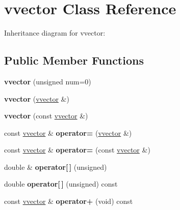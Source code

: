 \hypertarget{classvvector}{}\section{vvector Class Reference}
\label{classvvector}


Inheritance diagram for vvector\+:
\subsection*{Public Member Functions}
\begin{DoxyCompactItemize}
\item 
{\bfseries vvector} (unsigned num=0)\hypertarget{classvvector_a430ddabbbcd9e7f502710753573e07fa}{}\label{classvvector_a430ddabbbcd9e7f502710753573e07fa}

\item 
{\bfseries vvector} (\hyperlink{classvvector}{vvector} \&)\hypertarget{classvvector_a45fce2b52145ad89438753ada8e326b0}{}\label{classvvector_a45fce2b52145ad89438753ada8e326b0}

\item 
{\bfseries vvector} (const \hyperlink{classvvector}{vvector} \&)\hypertarget{classvvector_aa6f4bd016b72ea5128353bd5d08b8daa}{}\label{classvvector_aa6f4bd016b72ea5128353bd5d08b8daa}

\item 
const \hyperlink{classvvector}{vvector} \& {\bfseries operator=} (\hyperlink{classvvector}{vvector} \&)\hypertarget{classvvector_ac4f13dc26ec1e99676cf8be97a005ef6}{}\label{classvvector_ac4f13dc26ec1e99676cf8be97a005ef6}

\item 
const \hyperlink{classvvector}{vvector} \& {\bfseries operator=} (const \hyperlink{classvvector}{vvector} \&)\hypertarget{classvvector_ad595f03686c76b17701a02ef5059e5d8}{}\label{classvvector_ad595f03686c76b17701a02ef5059e5d8}

\item 
double \& {\bfseries operator\mbox{[}$\,$\mbox{]}} (unsigned)\hypertarget{classvvector_aabd73bf2650cea3493f8b659b07ea6da}{}\label{classvvector_aabd73bf2650cea3493f8b659b07ea6da}

\item 
double {\bfseries operator\mbox{[}$\,$\mbox{]}} (unsigned) const \hypertarget{classvvector_a0d67b734c51f12c093cff7f22290f1f2}{}\label{classvvector_a0d67b734c51f12c093cff7f22290f1f2}

\item 
const \hyperlink{classvvector}{vvector} \& {\bfseries operator+} (void) const \hypertarget{classvvector_ab7ef88878a276b79384d7a482e9fe839}{}\label{classvvector_ab7ef88878a276b79384d7a482e9fe839}


\end{DoxyCompactItemize}
